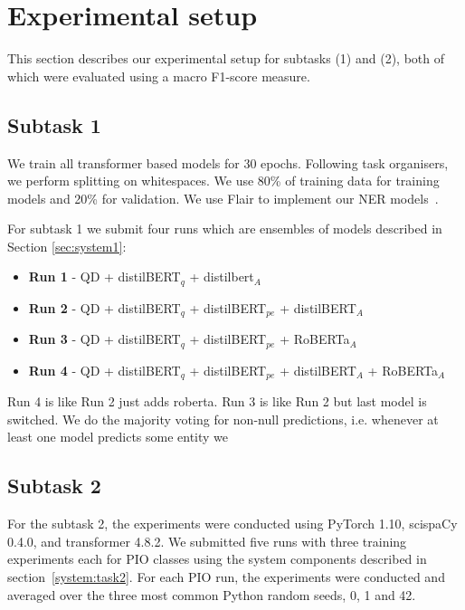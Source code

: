 \documentclass[11pt]{article}
\begin{document}
\section{Experimental setup}
This section describes our experimental setup for subtasks (1) and (2), both of which were evaluated using a macro F1-score measure.
%
%
%
%
%
%
\subsection{Subtask 1}

We train all transformer based models for 30 epochs. 
Following task organisers, we perform splitting on whitespaces.
We use 80\% of training data for training models and 20\% for validation.
We use Flair to implement our NER models~\cite{Akbik2019FLAIRAE}.

For subtask 1 we submit four runs which are ensembles of models described in Section \ref{sec:system1}:

\begin{itemize}
\item \textbf{Run 1} - QD + distilBERT$_q$ + distilbert$_A$
\item \textbf{Run 2} - QD + distilBERT$_q$ + distilBERT$_{pe}$ + distilBERT$_A$
\item \textbf{Run 3} - QD + distilBERT$_q$ + distilBERT$_{pe}$ + RoBERTa$_A$
\item \textbf{Run 4} - QD + distilBERT$_q$ + distilBERT$_{pe}$ + distilBERT$_A$ + RoBERTa$_A$ 
\end{itemize}

Run 4 is like Run 2 just adds roberta.
Run 3 is like Run 2 but last model is switched.
We do the majority voting for non-null predictions, i.e. whenever at least one model predicts some entity we 

%
%
%
\subsection{Subtask 2}
\label{exps:task2}
%
For the subtask 2, the experiments were conducted using PyTorch 1.10, scispaCy 0.4.0, and transformer 4.8.2.
We submitted five runs with three training experiments each for PIO classes using the system components described in section~\ref{system:task2}.
For each PIO run, the experiments were conducted and averaged over the three most common Python random seeds, 0, 1 and 42.
\end{document}
